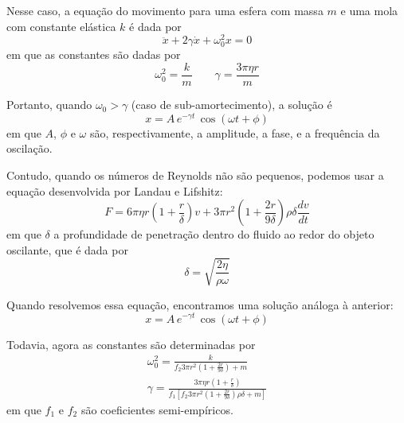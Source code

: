 \documentclass[a4paper, 12pt]{article}
\begin{document}
\begin{multicols}{2}
\begin{enumerate}
				\par Nesse caso, a equação do movimento para uma esfera com massa $m$ e uma mola com constante elástica $k$ é dada por
				\begin{equation}
					\ddot{x} + 2 \gamma \dot{x} + \omega_0^2 x = 0
				\end{equation}
				em que as constantes são dadas por
				\begin{equation}
					\omega_0^2 = \frac{k}{m} \qquad \gamma = \frac{3 \pi \eta r}{m}
				\end{equation}
				\par Portanto, quando $\omega_0 > \gamma$ (caso de sub-amortecimento), a solução é
				\begin{equation}
					x = A \, e^{- \gamma t} \, \cos (\omega t + \phi)
				\end{equation}
				em que $A$, $\phi$ e $\omega$ são, respectivamente, a amplitude, a fase, e a frequência da oscilação.
				\par Contudo, quando os números de Reynolds não são pequenos, podemos usar a equação desenvolvida por Landau e Lifshitz:
				\small \begin{equation}
					F = 6 \pi \eta r \left(1 + \frac{r}{\delta} \right) v + 3 \pi r^2 \left( 1 + \frac{2 r}{9 \delta} \right) \rho \delta \dfrac{d v}{d t}
				\end{equation} \normalsize
				em que $\delta$ a profundidade de penetração dentro do fluido ao redor do objeto oscilante, que é dada por
				\begin{equation}
					\delta = \sqrt{\frac{2 \eta}{\rho \omega}}
				\end{equation}
				\par Quando resolvemos essa equação, encontramos uma solução análoga à anterior:
				\begin{equation}
					x = A \, e^{- \gamma t} \, \cos (\omega t + \phi)
				\end{equation}
				\par Todavia, agora as constantes são determinadas por
				\begin{equation} \begin{split}
					\omega_0^2 = \frac{k}{f_2 3 \pi r^2 \left(1 + \frac{2 r}{9 \delta} \right) + m} \\
					\gamma = \frac{3 \pi \eta r \left(1+ \frac{r}{\delta} \right)}{f_1 \left[ f_2 3 \pi r^2 \left(1+\frac{2 r}{9 \delta} \right) \rho \delta + m \right]}
				\end{split} \end{equation}
				em que $f_1$ e $f_2$ são coeficientes semi-empíricos.
				

\end{enumerate}
\end{multicols}
\end{document}
